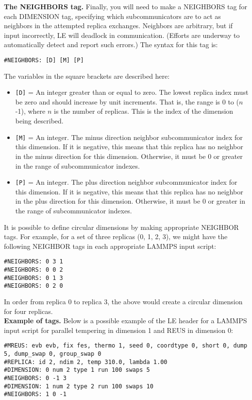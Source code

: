 \documentclass[10pt]{article}
\begin{document}
\textbf{The NEIGHBORS tag.}
Finally, you will need to make a NEIGHBORS tag for each DIMENSION tag, specifying which
subcommunicators are to act as neighbors in the attempted replica exchanges. Neighbors
are arbitrary, but if input incorrectly, LE will deadlock in communication. (Efforts
are underway to automatically detect and report such errors.) The syntax for this
tag is:
\begin{verbatim}
#NEIGHBORS: [D] [M] [P]
\end{verbatim}
The variables in the square brackets are described here:
\begin{itemize}
\item	\texttt{[D]} = An integer greater than or equal to zero. The lowest
		replica index must be zero and should increase by unit increments. That is,
		the range is 0 to ($n$-1), where $n$ is the number of replicas. This is
		the index of the dimension being described.
\item   \texttt{[M]} = An integer. The minus direction neighbor subcommunicator
		index for this dimension. If it is negative, this means that this 
		replica has no neighbor in the minus direction for this dimension. Otherwise,
		it must be 0 or greater in the range of subcommunicator indexes.
\item   \texttt{[P]} = An integer. The plus direction neighbor subcommunicator
		index for this dimension. If it is negative, this means that this 
		replica has no neighbor in the plus direction for this dimension. Otherwise,
		it must be 0 or greater in the range of subcommunicator indexes.
\end{itemize}

It is possible to define circular dimensions by making appropriate NEIGHBOR tags. For
example, for a set of three replicas (0, 1, 2, 3), we might have the following NEIGHBOR tags
in each appropriate LAMMPS input script:
\begin{verbatim}
#NEIGHBORS: 0 3 1
#NEIGHBORS: 0 0 2
#NEIGHBORS: 0 1 3
#NEIGHBORS: 0 2 0
\end{verbatim}
In order from replica 0 to replica 3, the above would create a circular dimension for four
replicas.
\\
\textbf{Example of tags.}
Below is a possible example of the LE header for a LAMMPS input script for 
parallel tempering in dimension 1 and REUS in dimension 0:
\begin{verbatim}
#MREUS: evb evb, fix fes, thermo 1, seed 0, coordtype 0, short 0, dump 5, dump_swap 0, group_swap 0
#REPLICA: id 2, ndim 2, temp 310.0, lambda 1.00
#DIMENSION: 0 num 2 type 1 run 100 swaps 5
#NEIGHBORS: 0 -1 3
#DIMENSION: 1 num 2 type 2 run 100 swaps 10
#NEIGHBORS: 1 0 -1
\end{verbatim}
\end{document}
